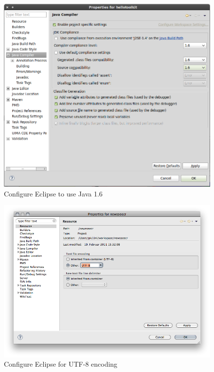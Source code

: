 \documentclass[a4paper,twoside]{book}      %
\begin{document}
\begin{figure}
\centering
\includegraphics[width=\textwidth]{img/ht09.png}
\caption{Configure Eclipse to use Java 1.6}
\label{fig:java603}
\end{figure}
\begin{figure}
\centering
\includegraphics[width=\textwidth]{img/ht16.png}
\caption{Configure Eclipse for UTF-8 encoding}
\label{fig:utf8}
\end{figure}
\end{document}
